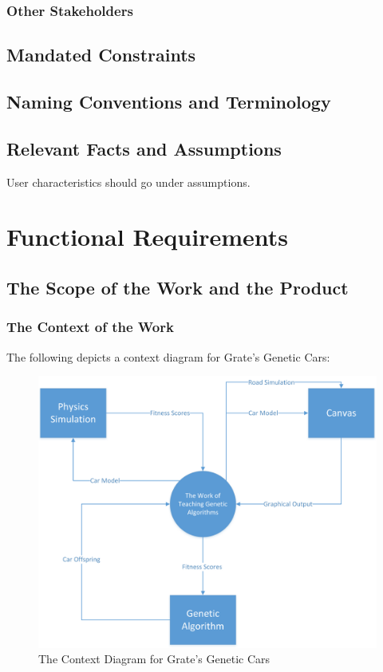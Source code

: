 \documentclass[12pt, titlepage]{article}
\begin{document}
\subsubsection{Other Stakeholders}

\subsection{Mandated Constraints}

\subsection{Naming Conventions and Terminology}

\subsection{Relevant Facts and Assumptions}

User characteristics should go under assumptions.

\section{Functional Requirements}

\subsection{The Scope of the Work and the Product}

\subsubsection{The Context of the Work}
The following depicts a context diagram for Grate's Genetic Cars:

\begin{figure}[h]
  \includegraphics[width=\linewidth]{ContextDiagram.png}
  \caption{The Context Diagram for Grate's Genetic Cars}
\end{figure}
\end{document}
